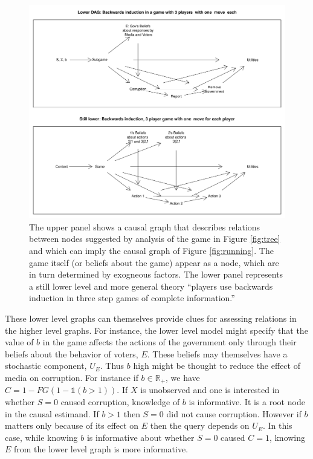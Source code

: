 \documentclass[12pt,]{book}
\begin{document}
\begin{figure}

{\centering \includegraphics[width=\textwidth]{ii_files/figure-latex/gamedag-1} 

}

\caption{\label{fig:gamedag} The upper panel shows a causal graph that describes  relations between nodes suggested by analysis of  the  game  in Figure \ref{fig:tree} and which can imply the causal graph of  Figure \ref{fig:running}. The game itself  (or beliefs about the game) appear as a node, which are in turn determined by exogneous factors.   The lower panel represents a still lower level and more general theory ``players use backwards induction in three step games of complete information.''}\label{fig:gamedag}
\end{figure}

These lower level graphs can themselves provide clues for assessing relations in the higher level graphs. For instance, the lower level model might specify that the value of \(b\) in the game affects the actions of the government only through their beliefs about the behavior of voters, \(E\). These beliefs may themselves have a stochastic component, \(U_E\). Thus \(b\) high might be thought to reduce the effect of media on corruption. For instance if \(b \in \mathbb{R}_+\), we have \(C= 1-FG(1-\mathbb{1}(b>1))\). If \(X\) is unobserved and one is interested in whether \(S=0\) caused corruption, knowledge of \(b\) is informative. It is a root node in the causal estimand. If \(b>1\) then \(S=0\) did not cause corruption. However if \(b\) matters only because of its effect on \(E\) then the query depends on \(U_E\). In this case, while knowing \(b\) is informative about whether \(S=0\) caused \(C=1\), knowing \(E\) from the lower level graph is more informative.
\end{document}
